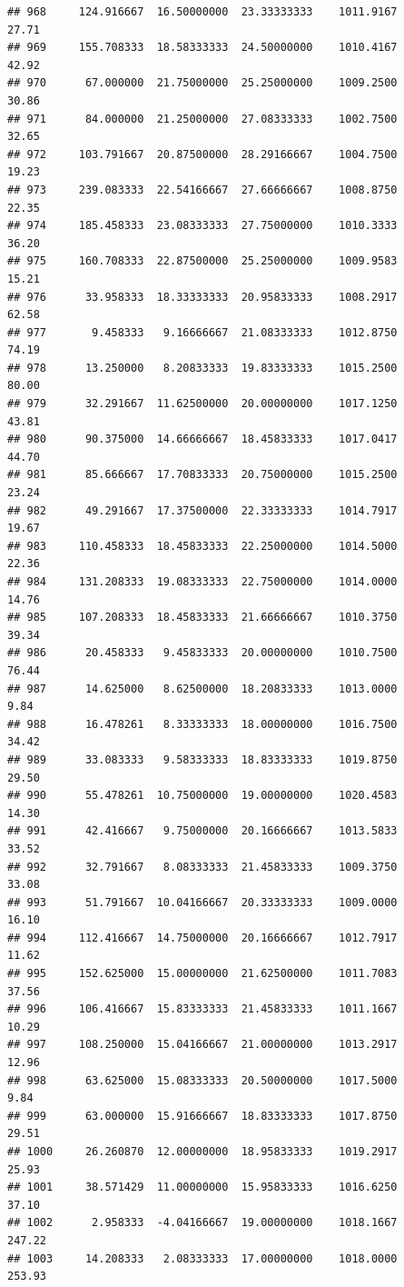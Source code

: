 \documentclass[
]{article}
\begin{document}
\begin{verbatim}
## 968     124.916667  16.50000000  23.33333333    1011.9167       27.71
## 969     155.708333  18.58333333  24.50000000    1010.4167       42.92
## 970      67.000000  21.75000000  25.25000000    1009.2500       30.86
## 971      84.000000  21.25000000  27.08333333    1002.7500       32.65
## 972     103.791667  20.87500000  28.29166667    1004.7500       19.23
## 973     239.083333  22.54166667  27.66666667    1008.8750       22.35
## 974     185.458333  23.08333333  27.75000000    1010.3333       36.20
## 975     160.708333  22.87500000  25.25000000    1009.9583       15.21
## 976      33.958333  18.33333333  20.95833333    1008.2917       62.58
## 977       9.458333   9.16666667  21.08333333    1012.8750       74.19
## 978      13.250000   8.20833333  19.83333333    1015.2500       80.00
## 979      32.291667  11.62500000  20.00000000    1017.1250       43.81
## 980      90.375000  14.66666667  18.45833333    1017.0417       44.70
## 981      85.666667  17.70833333  20.75000000    1015.2500       23.24
## 982      49.291667  17.37500000  22.33333333    1014.7917       19.67
## 983     110.458333  18.45833333  22.25000000    1014.5000       22.36
## 984     131.208333  19.08333333  22.75000000    1014.0000       14.76
## 985     107.208333  18.45833333  21.66666667    1010.3750       39.34
## 986      20.458333   9.45833333  20.00000000    1010.7500       76.44
## 987      14.625000   8.62500000  18.20833333    1013.0000        9.84
## 988      16.478261   8.33333333  18.00000000    1016.7500       34.42
## 989      33.083333   9.58333333  18.83333333    1019.8750       29.50
## 990      55.478261  10.75000000  19.00000000    1020.4583       14.30
## 991      42.416667   9.75000000  20.16666667    1013.5833       33.52
## 992      32.791667   8.08333333  21.45833333    1009.3750       33.08
## 993      51.791667  10.04166667  20.33333333    1009.0000       16.10
## 994     112.416667  14.75000000  20.16666667    1012.7917       11.62
## 995     152.625000  15.00000000  21.62500000    1011.7083       37.56
## 996     106.416667  15.83333333  21.45833333    1011.1667       10.29
## 997     108.250000  15.04166667  21.00000000    1013.2917       12.96
## 998      63.625000  15.08333333  20.50000000    1017.5000        9.84
## 999      63.000000  15.91666667  18.83333333    1017.8750       29.51
## 1000     26.260870  12.00000000  18.95833333    1019.2917       25.93
## 1001     38.571429  11.00000000  15.95833333    1016.6250       37.10
## 1002      2.958333  -4.04166667  19.00000000    1018.1667      247.22
## 1003     14.208333   2.08333333  17.00000000    1018.0000      253.93

\end{verbatim}
\end{document}
